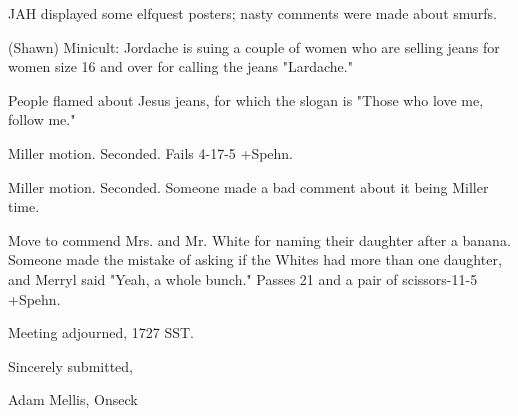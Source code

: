 \documentclass[12pt]{article}
\begin{document}
JAH displayed some elfquest posters; nasty comments were made about smurfs.

(Shawn) Minicult: Jordache is suing a couple of women who are selling jeans for women size 16 and over for calling the jeans "Lardache."

People flamed about Jesus jeans, for which the slogan is "Those who love me, follow me."

Miller motion. Seconded. Fails 4-17-5 +Spehn.

Miller motion. Seconded. Someone made a bad comment about it being Miller time.

Move to commend Mrs. and Mr. White for naming their daughter after a banana. Someone made the mistake of asking if the Whites had more than one daughter, and Merryl said "Yeah, a whole bunch." Passes 21 and a pair of scissors-11-5 +Spehn.

\vspace{12pt}

\noindent
Meeting adjourned, 1727 SST.

\vspace{18pt}

\centerline{Sincerely submitted,}
\centerline{Adam Mellis, Onseck}
\end{document}

